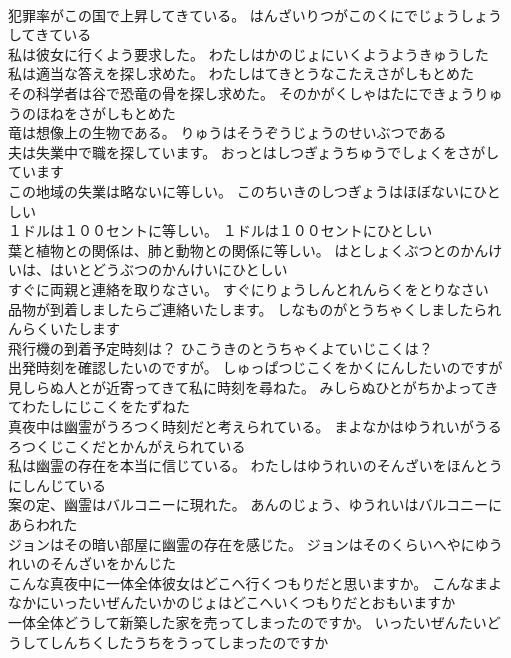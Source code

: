 \documentclass[8pt]{extreport}
\begin{document}
\begin{CJK}{UTF8}{min}
\\	犯罪率がこの国で上昇してきている。	はんざいりつがこのくにでじょうしょうしてきている 
\\	私は彼女に行くよう要求した。	わたしはかのじょにいくようようきゅうした 
\\	私は適当な答えを探し求めた。	わたしはてきとうなこたえさがしもとめた 
\\	その科学者は谷で恐竜の骨を探し求めた。	そのかがくしゃはたにできょうりゅうのほねをさがしもとめた 
\\	竜は想像上の生物である。	りゅうはそうぞうじょうのせいぶつである 
\\	夫は失業中で職を探しています。	おっとはしつぎょうちゅうでしょくをさがしています 
\\	この地域の失業は略ないに等しい。	このちいきのしつぎょうはほぼないにひとしい 
\\	１ドルは１００セントに等しい。	１ドルは１００セントにひとしい 
\\	葉と植物との関係は、肺と動物との関係に等しい。	はとしょくぶつとのかんけいは、はいとどうぶつのかんけいにひとしい 
\\	すぐに両親と連絡を取りなさい。	すぐにりょうしんとれんらくをとりなさい 
\\	品物が到着しましたらご連絡いたします。	しなものがとうちゃくしましたられんらくいたします 
\\	飛行機の到着予定時刻は？	ひこうきのとうちゃくよていじこくは？ 
\\	出発時刻を確認したいのですが。	しゅっぱつじこくをかくにんしたいのですが 
\\	見しらぬ人とが近寄ってきて私に時刻を尋ねた。	みしらぬひとがちかよってきてわたしにじこくをたずねた 
\\	真夜中は幽霊がうろつく時刻だと考えられている。	まよなかはゆうれいがうるろつくじこくだとかんがえられている 
\\	私は幽霊の存在を本当に信じている。	わたしはゆうれいのそんざいをほんとうにしんじている 
\\	案の定、幽霊はバルコニーに現れた。	あんのじょう、ゆうれいはバルコニーにあらわれた 
\\	ジョンはその暗い部屋に幽霊の存在を感じた。	ジョンはそのくらいへやにゆうれいのそんざいをかんじた 
\\	こんな真夜中に一体全体彼女はどこへ行くつもりだと思いますか。	こんなまよなかにいったいぜんたいかのじょはどこへいくつもりだとおもいますか 
\\	一体全体どうして新築した家を売ってしまったのですか。	いったいぜんたいどうしてしんちくしたうちをうってしまったのですか 

\end{CJK}
\end{document}
